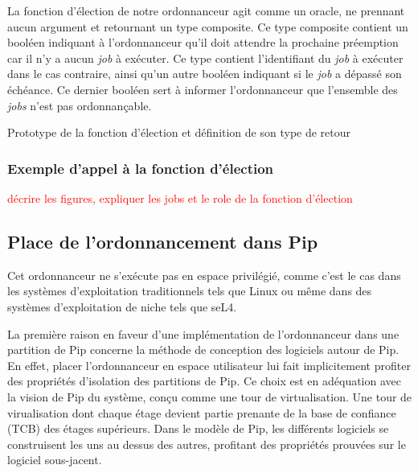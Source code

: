 		La fonction d'élection de notre ordonnanceur agit comme un oracle, ne prennant aucun argument et retournant un type composite. Ce type composite contient un booléen indiquant à l'ordonnanceur qu'il doit attendre la prochaine préemption car il n'y a aucun \emph{job} à exécuter. Ce type contient l'identifiant du \emph{job} à exécuter dans le cas contraire, ainsi qu'un autre booléen indiquant si le \emph{job} a dépassé son échéance. Ce dernier booléen sert à informer l'ordonnanceur que l'ensemble des \emph{jobs} n'est pas ordonnançable.

		\begin{listing}[!ht]
			\caption{Prototype de la fonction d'élection et définition de son type de retour }
		\end{listing}

			\subsubsection{Exemple d'appel à la fonction d'élection}

			\textcolor{red}{décrire les figures, expliquer les jobs et le role de la fonction d'élection}

			\begin{figure}[!ht]
			\end{figure}

			\begin{figure}[!ht]
			\end{figure}

		\subsection{Place de l'ordonnancement dans Pip}

		Cet ordonnanceur ne s'exécute pas en espace privilégié, comme c'est le cas dans les systèmes d'exploitation traditionnels tels que Linux ou même dans des systèmes d'exploitation de niche tels que seL4. 

		La première raison en faveur d'une implémentation de l'ordonnanceur dans une partition de Pip concerne la méthode de conception des logiciels autour de Pip. En effet, placer l'ordonnanceur en espace utilisateur lui fait implicitement profiter des propriétés d'isolation des partitions de Pip. Ce choix est en adéquation avec la vision de Pip du système, conçu comme une tour de virtualisation. Une tour de virualisation dont chaque étage devient partie prenante de la base de confiance (TCB) des étages supérieurs. Dans le modèle de Pip, les différents logiciels se construisent les uns au dessus des autres, profitant des propriétés prouvées sur le logiciel sous-jacent.

